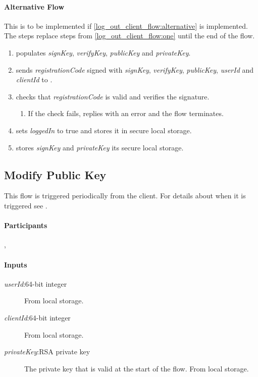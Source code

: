 \documentclass[a4paper,10pt,draft]{article}
\newcommand{\registrationCode}{\emph{registrationCode}}
\newcommand{\privateKey}{\emph{privateKey}}
\newcommand{\publicKey}{\emph{publicKey}}
\newcommand{\signKey}{\emph{signKey}}
\newcommand{\verifyKey}{\emph{verifyKey}}
\newcommand{\userId}{\emph{userId}}
\newcommand{\clientId}{\emph{clientId}}
\newcommand{\loggedIn}{\emph{loggedIn}}
\begin{document}
\paragraph{Alternative Flow}
\label{log_in_client_flow:alternative}

This is to be implemented if \ref{log_out_client_flow:alternative} is implemented. The steps replace steps from \ref{log_out_client_flow:one} until the end of the flow.

\begin{enumerate}
 \item \Client{} populates \signKey{}, \verifyKey{}, \publicKey{} and \privateKey{}.
 \item \Client{} sends \registrationCode{} signed with \signKey{}, \verifyKey{}, \publicKey{}, \userId{} and \clientId{} to \Server{}.
 \item \Server{} checks that \registrationCode{} is valid and verifies the signature.
 \begin{enumerate}
  \item If the check fails, \Server{} replies with an error and the flow terminates.
 \end{enumerate}
 \item \Client{} sets \loggedIn{} to true and stores it in secure local storage.
 \item \Client{} stores \signKey{} and \privateKey{} its secure local storage.
\end{enumerate}

\subsection{Modify Public Key}
\label{modify_public_key_flow}
This flow is triggered periodically from the client. For details about when it 
is triggered see \cite{crypto_spec}.

\paragraph{Participants} \Client{}, \Server{}

\paragraph{Inputs}
\SpecialItem
\begin{description}
 \item[\userId{}:64-bit integer] From \Client{} local storage.
 \item[\clientId{}:64-bit integer] From \Client{} local storage.
 \item[\privateKey{}:RSA private key] The private key that is valid at the 
start of the flow. From \Client{} local storage.
\end{description}
\end{document}
